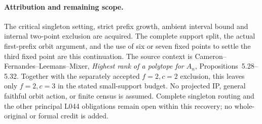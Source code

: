\documentclass[11pt,a4paper]{article}
\begin{document}
\paragraph{Attribution and remaining scope.}
The critical singleton setting, strict prefix growth, ambient interval
bound and internal two-point exclusion are acquired. The complete
support split, the actual first-prefix orbit argument, and the use of
six or seven fixed points to settle the third fixed point are this
continuation. The source context is Cameron--Fernandes--Leemans--Mixer,
\emph{Highest rank of a polytope for $A_n$}, Propositions~5.28--5.32.
Together with the separately accepted $f=2,c=2$ exclusion, this leaves
only $f=2,c=3$ in the stated small-support budget. No projected IP,
general faithful orbit action, or finite census is assumed. Complete
singleton routing and the other principal L044 obligations remain open
within this recovery; no whole-original or formal credit is added.
\end{document}
